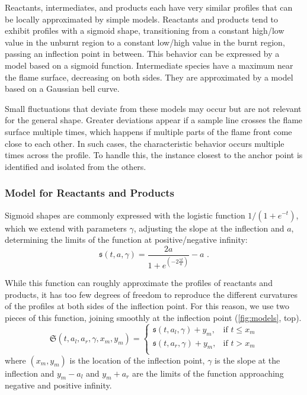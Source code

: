 %
Reactants, intermediates, and products each have very similar profiles that can
be locally approximated by simple models.
%
Reactants and products tend to exhibit profiles with a sigmoid shape,
transitioning from a constant high/low value in the unburnt region to a constant
low/high value in the burnt region, passing an inflection point in between.
%
This behavior can be expressed by a model based on a sigmoid function.
%
Intermediate species have a maximum near the flame surface, decreasing on both
sides.
%
They are approximated by a model based on a Gaussian bell curve.
%

%
Small fluctuations that deviate from these models may occur but are not relevant
for the general shape.
%
Greater deviations appear if a sample line crosses the flame surface multiple
times, which happens if multiple parts of the flame front come close to each
other.
%
In such cases, the characteristic behavior occurs multiple times across the
profile.
%
To handle this, the instance closest to the anchor point is identified and
isolated from the others.
%
\subsubsection{Model for Reactants and Products} %
\label{ssub:model_for_reactants_products}
%
Sigmoid shapes are commonly expressed with the logistic function $1/(1+e^{-t})$,
which we extend with parameters $\gamma$, adjusting the slope at the inflection
and $a$, determining the limits of the function at positive/negative infinity:
%
\begin{equation}
	\mathfrak{s}(t,a,\gamma)
		= \frac{2a}{ 1 + e^{ (-2\frac{\gamma t}{a}) } } - a \text{ .}
\end{equation}
%

%
While this function can roughly approximate the profiles of reactants and
products, it has too few degrees of freedom to reproduce the different
curvatures of the profiles at both sides of the inflection point.
%
For this reason, we use two pieces of this function, joining smoothly at the
inflection point (\cref{fig:models}, top).
%
\begin{equation}
		\mathfrak{S}(t, a_l, a_r, \gamma, x_m, y_m) =
		\begin{cases}
			\mathfrak{s}(t, a_l, \gamma) + y_m, &\text{if }  t \leq x_m\\
			\mathfrak{s}(t, a_r, \gamma) + y_m, & \text{if }  t > x_m\\
		\end{cases}
\end{equation}
%
where $(x_m, y_m)$ is the location of the inflection point, $\gamma$ is the
slope at the inflection and $y_m-a_l$ and $y_m+a_r$ are the limits of the
function approaching negative and positive infinity.
%
%
